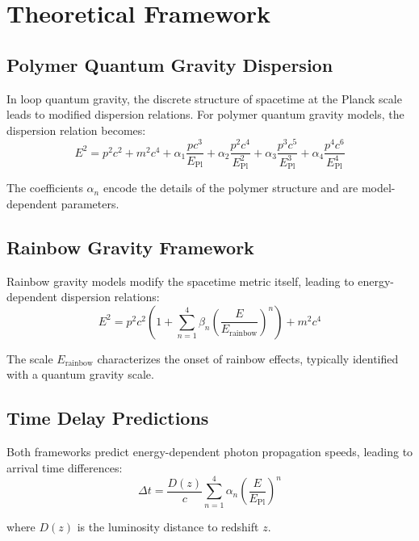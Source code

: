 \documentclass[12pt]{article}
\begin{document}
\section{Theoretical Framework}

\subsection{Polymer Quantum Gravity Dispersion}

In loop quantum gravity, the discrete structure of spacetime at the Planck scale leads to modified dispersion relations. For polymer quantum gravity models, the dispersion relation becomes:
\begin{equation}
E^2 = p^2c^2 + m^2c^4 + \alpha_1 \frac{pc^3}{E_{\text{Pl}}} + \alpha_2 \frac{p^2c^4}{E_{\text{Pl}}^2} + \alpha_3 \frac{p^3c^5}{E_{\text{Pl}}^3} + \alpha_4 \frac{p^4c^6}{E_{\text{Pl}}^4}
\end{equation}

The coefficients $\alpha_n$ encode the details of the polymer structure and are model-dependent parameters.

\subsection{Rainbow Gravity Framework}

Rainbow gravity models modify the spacetime metric itself, leading to energy-dependent dispersion relations:
\begin{equation}
E^2 = p^2c^2 \left(1 + \sum_{n=1}^4 \beta_n \left(\frac{E}{E_{\text{rainbow}}}\right)^n\right) + m^2c^4
\end{equation}

The scale $E_{\text{rainbow}}$ characterizes the onset of rainbow effects, typically identified with a quantum gravity scale.

\subsection{Time Delay Predictions}

Both frameworks predict energy-dependent photon propagation speeds, leading to arrival time differences:
\begin{equation}
\Delta t = \frac{D(z)}{c} \sum_{n=1}^4 \alpha_n \left(\frac{E}{E_{\text{Pl}}}\right)^n
\end{equation}

where $D(z)$ is the luminosity distance to redshift $z$.
\end{document}

